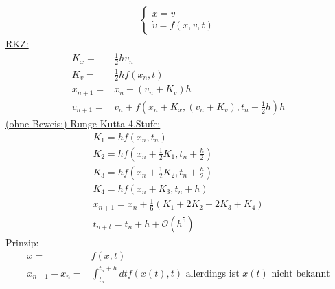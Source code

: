 \documentclass[12pt]{article}
\begin{document}
\begin{itemize}
\begin{align}
\begin{cases}
\dot{x}=v \\
\dot{v}= f(x,v,t)
\end{cases}
\end{align}
\underline{RKZ:}\begin{align}
K_x =& \frac{1}{2} h v_n \\
K_v = & \frac{1}{2} h f(x_n, t) \\
x_{n+1} =& x_n + (v_n + K_v) h \\
v_{n+1}= & v_n + f(x_n+K_x, (v_n+K_v), t_n+\frac{1}{2}h)h
\end{align}
\underline{(ohne Beweis:) Runge Kutta 4.Stufe:}
\begin{align}
K_1= hf(x_n, t_n) \\
K_2=h f(x_n + \frac{1}{2} K_1, t_n + \frac{h}{2}) \\
K_3= h f(x_n + \frac{1}{2} K_2, t_n + \frac{h}{2}) \\
K_4= h f(x_n +  K_3, t_n + h) \\
x_{n+1}= x_n + \frac{1}{6} (K_1 + 2 K_2 + 2 K_3 + K_4) \\
t_{n+t} = t_n + h + \mathcal{O}(h^5)
\end{align}
Prinzip:
\begin{align}
\dot{x}=& f(x,t) \\
x_{n+1} - x_n =& \int_{t_n}^{t_n+h} dt f(x(t), t) \mbox{  allerdings ist } x(t) \mbox{ nicht bekannt}
\end{align}
\end{itemize}
\end{document}
